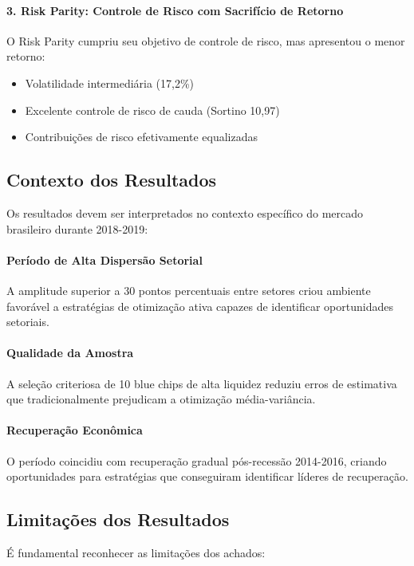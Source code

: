 \paragraph{3. Risk Parity: Controle de Risco com Sacrifício de Retorno}
O Risk Parity cumpriu seu objetivo de controle de risco, mas apresentou o menor retorno:
\begin{itemize}
    \item Volatilidade intermediária (17,2\%)
    \item Excelente controle de risco de cauda (Sortino 10,97)
    \item Contribuições de risco efetivamente equalizadas
\end{itemize}

\subsection{Contexto dos Resultados}

Os resultados devem ser interpretados no contexto específico do mercado brasileiro durante 2018-2019:

\paragraph{Período de Alta Dispersão Setorial}
A amplitude superior a 30 pontos percentuais entre setores criou ambiente favorável a estratégias de otimização ativa capazes de identificar oportunidades setoriais.

\paragraph{Qualidade da Amostra}
A seleção criteriosa de 10 blue chips de alta liquidez reduziu erros de estimativa que tradicionalmente prejudicam a otimização média-variância.

\paragraph{Recuperação Econômica}
O período coincidiu com recuperação gradual pós-recessão 2014-2016, criando oportunidades para estratégias que conseguiram identificar líderes de recuperação.

\subsection{Limitações dos Resultados}

É fundamental reconhecer as limitações dos achados:

